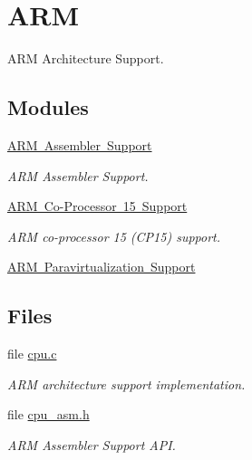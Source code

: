 \hypertarget{group__RTEMSScoreCPUARM}{}\section{A\+RM}
\label{group__RTEMSScoreCPUARM}


A\+RM Architecture Support.  


\subsection*{Modules}
\begin{DoxyCompactItemize}
\item 
\mbox{\hyperlink{group__RTEMSScoreCPUARMASM}{A\+R\+M Assembler Support}}
\begin{DoxyCompactList}\small\item\em A\+RM Assembler Support. \end{DoxyCompactList}\item 
\mbox{\hyperlink{group__RTEMSScoreCPUARMCP15}{A\+R\+M Co-\/\+Processor 15 Support}}
\begin{DoxyCompactList}\small\item\em A\+RM co-\/processor 15 (C\+P15) support. \end{DoxyCompactList}\item 
\mbox{\hyperlink{group__RTEMSScoreCPUARMParavirt}{A\+R\+M Paravirtualization Support}}
\end{DoxyCompactItemize}
\subsection*{Files}
\begin{DoxyCompactItemize}
\item 
file \mbox{\hyperlink{cpukit_2score_2cpu_2arm_2cpu_8c}{cpu.\+c}}
\begin{DoxyCompactList}\small\item\em A\+RM architecture support implementation. \end{DoxyCompactList}\item 
file \mbox{\hyperlink{arm_2include_2rtems_2score_2cpu__asm_8h}{cpu\+\_\+asm.\+h}}
\begin{DoxyCompactList}\small\item\em A\+RM Assembler Support A\+PI. \end{DoxyCompactList}\end{DoxyCompactItemize}
